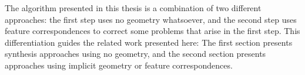 The algorithm presented in this thesis is a combination of two different approaches: the first step uses no geometry whatsoever, and the second step uses feature correspondences to correct some problems that arise in the first step. This differentiation guides the related work presented here: The first section presents synthesis approaches using no geometry, and the second section presents approaches using implicit geometry or feature correspondences.






